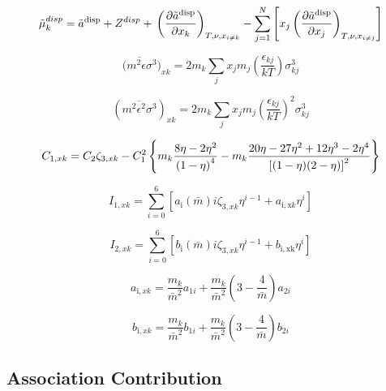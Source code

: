 \documentclass[12pt, letterpaper]{article}
\begin{document}
\cite{Gross2001}

\begin{equation}
\tilde{\mu}^{disp}_k = \tilde{a}^{\mathrm{disp}} + Z^{disp} + \\\left(\frac{\partial\tilde{a}^{\mathrm{disp}}}{\partial x_{k}}\right)_{T,\nu,x_{i\neq k}}-\sum_{j=1}^{N}\left[x_{j}\left(\frac{\partial\tilde{a}^{\mathrm{disp}}}{\partial x_{j}}\right)_{T,\nu,x_{i\neq j}}\right]
\end{equation}

\begin{equation}
\overline{(m^{2}\epsilon\sigma^{3}})_{xk}=2m_{k}\sum_{j}x_{j}m_{j}\left(\frac{\epsilon_{kj}}{kT}\right)\sigma_{kj}^{3}
\end{equation}

\begin{equation}
(\overline{m^2\epsilon^2\sigma^3})_{xk}=2m_k\sum_jx_jm_j\left(\frac{\epsilon_{kj}}{kT}\right)^2\sigma_{kj}^3
\end{equation}

\begin{equation}
C_{1,xk}=C_{2}\zeta_{3,xk}-\\C_{1}^{2}\left\{m_{k}\frac{8\eta-2\eta^{2}}{\left(1-\eta\right)^{4}}-m_{k}\frac{20\eta-27\eta^{2}+12\eta^{3}-2\eta^{4}}{\left[(1-\eta)(2-\eta)\right]^{2}}\right\}
\end{equation}

\begin{equation}
I_{1,xk}=\sum_{i=0}^{6}[a_{\mathrm{i}}(\bar{m})i\zeta_{3,xk}\eta^{i-1}+a_{\mathrm{i,x}k}\eta^{i}]
\end{equation}

\begin{equation}
I_{2,xk}=\sum_{i=0}^{6}[b_{\mathrm{i}}(\bar{m})i\zeta_{3,xk}\eta^{i-1}+b_{\mathrm{i,xk}}\eta^{i}]
\end{equation}

\begin{equation}
a_{\mathrm{i},xk}=\frac{m_{k}}{\bar{m}^{2}}a_{1i}+\frac{m_{k}}{\bar{m}^{2}}\left(3-\frac{4}{\bar{m}}\right)a_{2i}
\end{equation}

\begin{equation}
b_{\mathrm{i},xk}=\frac{m_{k}}{\bar{m}^{2}}b_{1i}+\frac{m_{k}}{\bar{m}^{2}}\left(3-\frac{4}{\bar{m}}\right)b_{2i}
\end{equation}

\subsection{Association Contribution}
\end{document}
